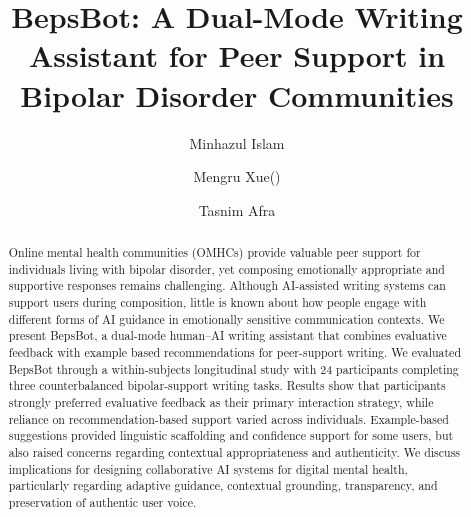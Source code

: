 \documentclass[]{llncs}
\begin{document}
%
\title{BepsBot: A Dual-Mode Writing Assistant for Peer Support in Bipolar Disorder Communities}
%
%
\author{Minhazul Islam\inst{} \and
Mengru Xue({\faEnvelopeO})\inst{}\inst{} \and
Tasnim Afra\inst{}}
%
%


\maketitle         %
%
\begin{abstract}

Online mental health communities (OMHCs) provide valuable peer support for individuals living with bipolar disorder, yet composing emotionally appropriate and supportive responses remains challenging. Although AI-assisted writing systems can support users during composition, little is known about how people engage with different forms of AI guidance in emotionally sensitive communication contexts. We present BepsBot, a dual-mode human--AI writing assistant that combines evaluative feedback with example based recommendations for peer-support writing. We evaluated BepsBot through a within-subjects longitudinal study with 24 participants completing three counterbalanced bipolar-support writing tasks. Results show that participants strongly preferred evaluative feedback as their primary interaction strategy, while reliance on recommendation-based support varied across individuals. Example-based suggestions provided linguistic scaffolding and confidence support for some users, but also raised concerns regarding contextual appropriateness and authenticity. We discuss implications for designing collaborative AI systems for digital mental health, particularly regarding adaptive guidance, contextual grounding, transparency, and preservation of authentic user voice.


\end{abstract}
\end{document}
